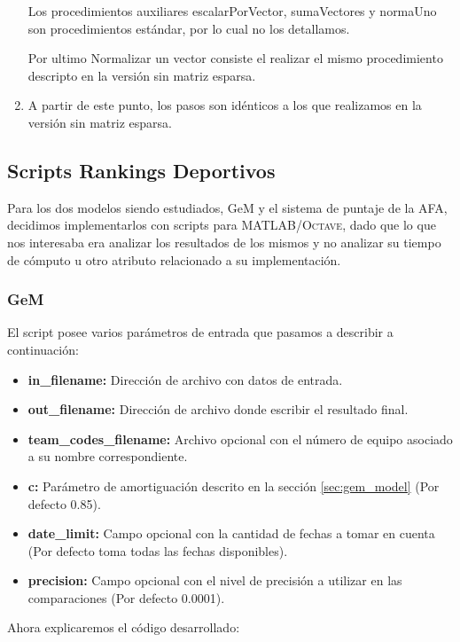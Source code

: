 \begin{enumerate}
	Los procedimientos auxiliares escalarPorVector, sumaVectores y normaUno son procedimientos estándar, por lo cual no los detallamos.

	Por ultimo Normalizar un vector consiste el realizar el mismo procedimiento descripto en la versión sin matriz esparsa.
	\item A partir de este punto, los pasos son idénticos a los que realizamos en la versión sin matriz esparsa.

\end{enumerate}

\subsection{Scripts Rankings Deportivos}

Para los dos modelos siendo estudiados, GeM y el sistema de puntaje de la AFA,
decidimos implementarlos con scripts para \textsc{MATLAB/Octave}, dado que lo que nos
interesaba era analizar los resultados de los mismos y no analizar su tiempo de
cómputo u otro atributo relacionado a su implementación.

\subsubsection{GeM}

El script posee varios parámetros de entrada que pasamos a describir a
continuación:

\begin{itemize}
	\item \textbf{in_filename:} Dirección de archivo con datos de entrada.
	\item \textbf{out_filename:} Dirección de archivo donde escribir el
	resultado final.
	\item \textbf{team_codes_filename:} Archivo opcional con el número de equipo
	asociado a su nombre correspondiente.
	\item \textbf{c:} Parámetro de amortiguación descrito en la
	sección \ref{sec:gem_model} (Por defecto 0.85).
	\item \textbf{date_limit:} Campo opcional con la cantidad de fechas a tomar
	en cuenta (Por defecto toma todas las fechas disponibles).
\item \textbf{precision:} Campo opcional con el nivel de precisión a utilizar en
	las comparaciones (Por defecto 0.0001).
\end{itemize}

Ahora explicaremos el código desarrollado:

